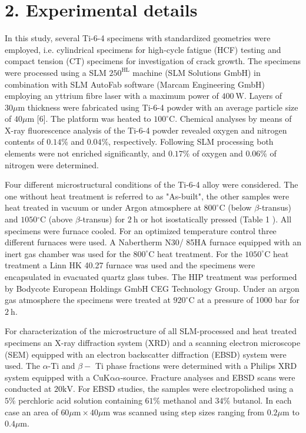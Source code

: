\documentclass[10pt]{article}
\begin{document}
\section*{2. Experimental details}
In this study, several Ti-6-4 specimens with standardized geometries were employed, i.e. cylindrical specimens for high-cycle fatigue (HCF) testing and compact tension (CT) specimens for investigation of crack growth. The specimens were processed using a SLM $250^{\mathrm{HL}}$ machine (SLM Solutions GmbH) in combination with SLM AutoFab software (Marcam Engineering GmbH) employing an yttrium fibre laser with a maximum power of $400 \mathrm{~W}$. Layers of $30 \mu \mathrm{m}$ thickness were fabricated using Ti-6-4 powder with an average particle size of $40 \mu \mathrm{m}$ [6]. The platform was heated to $100^{\circ} \mathrm{C}$. Chemical analyses by means of X-ray fluorescence analysis of the Ti-6-4 powder revealed oxygen and nitrogen contents of $0.14 \%$ and $0.04 \%$, respectively. Following SLM processing both elements were not enriched significantly, and $0.17 \%$ of oxygen and $0.06 \%$ of nitrogen were determined.

Four different microstructural conditions of the Ti-6-4 alloy were considered. The one without heat treatment is referred to as "As-built", the other samples were heat treated in vacuum or under Argon atmosphere at $800^{\circ} \mathrm{C}$ (below $\beta$-transus) and $1050{ }^{\circ} \mathrm{C}$ (above $\beta$-transus) for $2 \mathrm{~h}$ or hot isostatically pressed (Table 1 ). All specimens were furnace cooled. For an optimized temperature control three different furnaces were used. A Nabertherm N30/ 85HA furnace equipped with an inert gas chamber was used for the $800^{\circ} \mathrm{C}$ heat treatment. For the $1050^{\circ} \mathrm{C}$ heat treatment a Linn HK 40.27 furnace was used and the specimens were encapsulated in evacuated quartz glass tubes. The HIP treatment was performed by Bodycote European Holdings GmbH CEG Technology Group. Under an argon gas atmosphere the specimens were treated at $920^{\circ} \mathrm{C}$ at a pressure of 1000 bar for $2 \mathrm{~h}$.

For characterization of the microstructure of all SLM-processed and heat treated specimens an X-ray diffraction system (XRD) and a scanning electron microscope (SEM) equipped with an electron backscatter diffraction (EBSD) system were used. The $\alpha$-Ti and $\beta-$ Ti phase fractions were determined with a Philips XRD system equipped with a $\mathrm{Cu} \mathrm{K \alpha} \alpha$-source. Fracture analyses and EBSD scans were conducted at $20 \mathrm{kV}$. For EBSD studies, the samples were electropolished using a $5 \%$ perchloric acid solution containing $61 \%$ methanol and $34 \%$ butanol. In each case an area of $60 \mu \mathrm{m} \times 40 \mu \mathrm{m}$ was scanned using step sizes ranging from $0.2 \mu \mathrm{m}$ to $0.4 \mu \mathrm{m}$.
\end{document}
